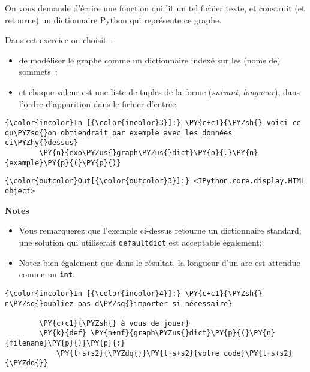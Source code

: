     On vous demande d'écrire une fonction qui lit un tel fichier texte, et
construit (et retourne) un dictionnaire Python qui représente ce graphe.

Dans cet exercice on choisit~:

\begin{itemize}
\tightlist
\item
  de modéliser le graphe comme un dictionnaire indexé sur les (noms de)
  sommets~;
\item
  et chaque valeur est une liste de tuples de la forme (\emph{suivant},
  \emph{longueur}), dans l'ordre d'apparition dans le fichier d'entrée.
\end{itemize}

    \begin{Verbatim}[commandchars=\\\{\},frame=single,framerule=0.3mm,rulecolor=\color{cellframecolor}]
{\color{incolor}In [{\color{incolor}3}]:} \PY{c+c1}{\PYZsh{} voici ce qu\PYZsq{}on obtiendrait par exemple avec les données ci\PYZhy{}dessus}
        \PY{n}{exo\PYZus{}graph\PYZus{}dict}\PY{o}{.}\PY{n}{example}\PY{p}{(}\PY{p}{)}
\end{Verbatim}


\begin{Verbatim}[commandchars=\\\{\},frame=single,framerule=0.3mm,rulecolor=\color{cellframecolor}]
{\color{outcolor}Out[{\color{outcolor}3}]:} <IPython.core.display.HTML object>
\end{Verbatim}
            
    \textbf{Notes}

\begin{itemize}
\tightlist
\item
  Vous remarquerez que l'exemple ci-dessus retourne un dictionnaire
  standard; une solution qui utiliserait \texttt{defaultdict} est
  acceptable également;
\item
  Notez bien également que dans le résultat, la longueur d'un arc est
  attendue comme un \textbf{\texttt{int}}.
\end{itemize}

    \begin{Verbatim}[commandchars=\\\{\},frame=single,framerule=0.3mm,rulecolor=\color{cellframecolor}]
{\color{incolor}In [{\color{incolor}4}]:} \PY{c+c1}{\PYZsh{} n\PYZsq{}oubliez pas d\PYZsq{}importer si nécessaire}
        
        \PY{c+c1}{\PYZsh{} à vous de jouer}
        \PY{k}{def} \PY{n+nf}{graph\PYZus{}dict}\PY{p}{(}\PY{n}{filename}\PY{p}{)}\PY{p}{:}
            \PY{l+s+s2}{\PYZdq{}}\PY{l+s+s2}{votre code}\PY{l+s+s2}{\PYZdq{}}
\end{Verbatim}


